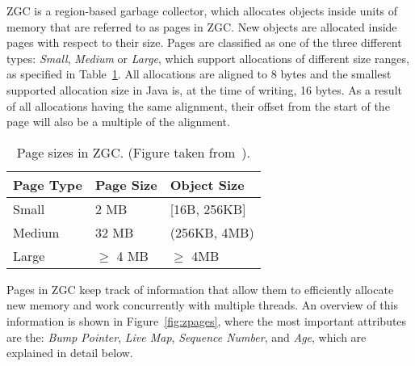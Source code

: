 
ZGC is a region-based garbage collector, which allocates objects inside units of memory that are referred to as pages in ZGC. New objects are allocated inside pages with respect to their size. Pages are classified as one of the three different types: \textit{Small}, \textit{Medium} or \textit{Large}, which support allocations of different size ranges, as specified in Table~\ref{table:zpage_sizes}. All allocations are aligned to 8 bytes and the smallest supported allocation size in Java is, at the time of writing, 16 bytes. As a result of all allocations having the same alignment, their offset from the start of the page will also be a multiple of the alignment.

\begin{table}[H]
    \centering
    \begin{tabular}{lllll}
        Page Type   & Page Size     & \multicolumn{3}{l}{Object Size}      \\ \hline
        Small       & 2 MB          & \multicolumn{3}{l}{{[}16B, 256KB{]}} \\
        Medium      & 32 MB         & \multicolumn{3}{l}{(256KB, 4MB)}     \\
        Large       & $\geq$ 4 MB   & \multicolumn{3}{l}{$\geq$ 4MB}       \\
    \end{tabular}
    \caption{Page sizes in ZGC. (Figure taken from~\cite{zpage_size_table}). }
    \label{table:zpage_sizes}
\end{table}

Pages in ZGC keep track of information that allow them to efficiently allocate new memory and work concurrently with multiple threads. An overview of this information is shown in Figure~\ref{fig:zpages}, where the most important attributes are the: \textit{Bump Pointer}, \textit{Live Map}, \textit{Sequence Number}, and \textit{Age}, which are explained in detail below.

